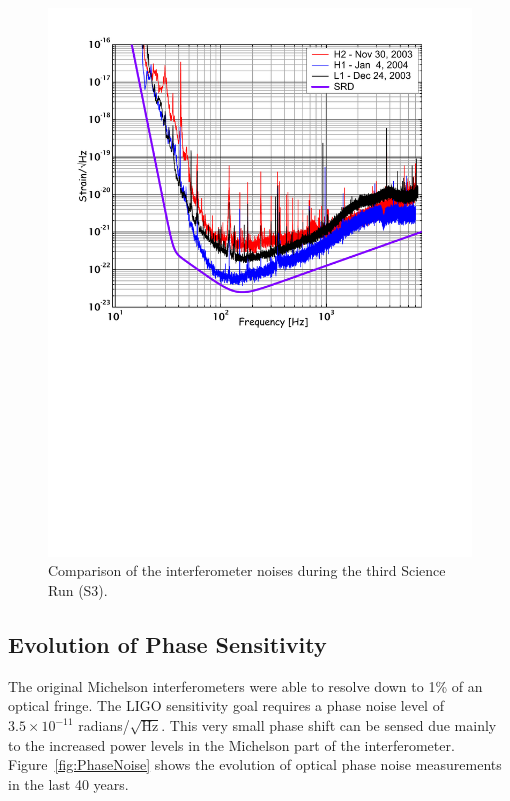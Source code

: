 \begin{figure}[!h]
\centerline{
\includegraphics[angle=0,width=6.5in]{Figures/Chap4/S3noiseComp.pdf}}
\caption[S3 Noise Curves]{Comparison of the interferometer noises during the
           third Science Run (S3).}
\label{fig:S3noiseComp}
\end{figure}


\subsection{Evolution of Phase Sensitivity}

The original Michelson interferometers were able to resolve
down to 1\% of an optical fringe. The LIGO sensitivity goal requires a phase
noise level of $3.5 \times 10^{-11}$ radians/$\sqrt{\mbox{Hz}}$. This very
small phase shift can be sensed due mainly to the increased power levels
in the Michelson part of the interferometer. Figure~\ref{fig:PhaseNoise}
shows the evolution of optical phase noise measurements in the last 40 years.


